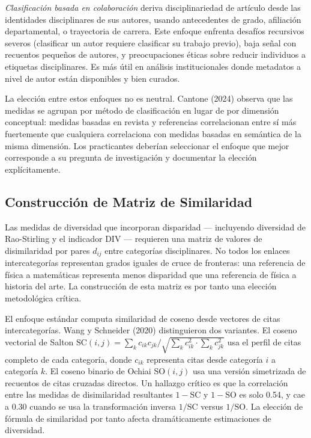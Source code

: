 \documentclass[
]{article}
\begin{document}
\emph{Clasificación basada en colaboración} deriva disciplinariedad de
artículo desde las identidades disciplinares de sus autores, usando
antecedentes de grado, afiliación departamental, o trayectoria de
carrera. Este enfoque enfrenta desafíos recursivos severos (clasificar
un autor requiere clasificar su trabajo previo), baja señal con
recuentos pequeños de autores, y preocupaciones éticas sobre reducir
individuos a etiquetas disciplinares. Es más útil en análisis
institucionales donde metadatos a nivel de autor están disponibles y
bien curados.

La elección entre estos enfoques no es neutral. Cantone (2024) observa
que las medidas se agrupan por método de clasificación en lugar de por
dimensión conceptual: medidas basadas en revista y referencias
correlacionan entre sí más fuertemente que cualquiera correlaciona con
medidas basadas en semántica de la misma dimensión. Los practicantes
deberían seleccionar el enfoque que mejor corresponde a su pregunta de
investigación y documentar la elección explícitamente.

\hypertarget{construcciuxf3n-de-matriz-de-similaridad}{%
\subsection{Construcción de Matriz de
Similaridad}\label{construcciuxf3n-de-matriz-de-similaridad}}

Las medidas de diversidad que incorporan disparidad --- incluyendo
diversidad de Rao-Stirling y el indicador DIV --- requieren una matriz
de valores de disimilaridad por pares \(d_{ij}\) entre categorías
disciplinares. No todos los enlaces intercategorías representan grados
iguales de cruce de fronteras: una referencia de física a matemáticas
representa menos disparidad que una referencia de física a historia del
arte. La construcción de esta matriz es por tanto una elección
metodológica crítica.

El enfoque estándar computa similaridad de coseno desde vectores de
citas intercategorías. Wang y Schneider (2020) distinguieron dos
variantes. El coseno vectorial de Salton
\(\text{SC}(i,j) = \sum_k c_{ik} c_{jk} / \sqrt{\sum_k c_{ik}^2 \cdot \sum_k c_{jk}^2}\)
usa el perfil de citas completo de cada categoría, donde \(c_{ik}\)
representa citas desde categoría \(i\) a categoría \(k\). El coseno
binario de Ochiai \(\text{SO}(i,j)\) usa una versión simetrizada de
recuentos de citas cruzadas directos. Un hallazgo crítico es que la
correlación entre las medidas de disimilaridad resultantes
\(1 - \text{SC}\) y \(1 - \text{SO}\) es solo 0.54, y cae a 0.30 cuando
se usa la transformación inversa \(1/\text{SC}\) versus \(1/\text{SO}\).
La elección de fórmula de similaridad por tanto afecta dramáticamente
estimaciones de diversidad.
\end{document}
